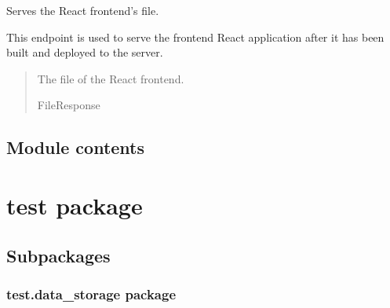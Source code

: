 \documentclass[letterpaper,10pt,english]{sphinxmanual}
\begin{document}

\begin{fulllineitems}
\label{\detokenize{my_fastapi:my_fastapi.main.serve_frontend}}
\pysigstartsignatures
\pysiglinewithargsret
{}
{}
{}
\pysigstopsignatures
\sphinxAtStartPar
Serves the React frontend’s  file.

\sphinxAtStartPar
This endpoint is used to serve the frontend React application after it has been built
and deployed to the server.
\begin{quote}\begin{description}
\sphinxAtStartPar
The  file of the React frontend.

\sphinxAtStartPar
FileResponse

\end{description}\end{quote}

\end{fulllineitems}



\section{Module contents}
\label{\detokenize{my_fastapi:module-my_fastapi}}\label{\detokenize{my_fastapi:module-contents}}
\sphinxstepscope


\chapter{test package}
\label{\detokenize{test:test-package}}\label{\detokenize{test::doc}}

\section{Subpackages}
\label{\detokenize{test:subpackages}}
\sphinxstepscope


\subsection{test.data\_storage package}
\label{\detokenize{test.data_storage:test-data-storage-package}}\label{\detokenize{test.data_storage::doc}}
\end{document}
